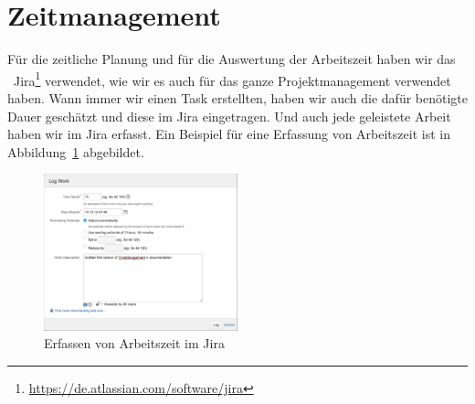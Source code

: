 \chapter*{Zeitmanagement}
	Für die zeitliche Planung und für die Auswertung der Arbeitszeit haben wir das \ppt\ Jira\footnote{\url{https://de.atlassian.com/software/jira}} verwendet,
	wie wir es auch für das ganze Projektmanagement verwendet haben.
	Wann immer wir einen Task erstellten, haben wir auch die dafür benötigte Dauer geschätzt
	und diese im Jira eingetragen.
	Und auch jede geleistete Arbeit haben wir im Jira erfasst.
	Ein Beispiel für eine Erfassung von Arbeitszeit ist in Abbildung\ \ref{fig:logWork} abgebildet.
	\begin{figure}[H]
		\includegraphics[width=0.5\textwidth]{projectPlan/media/img/logWork.png}
		\centering
		\caption{Erfassen von Arbeitszeit im Jira}
		\label{fig:logWork}
	\end{figure}
	
